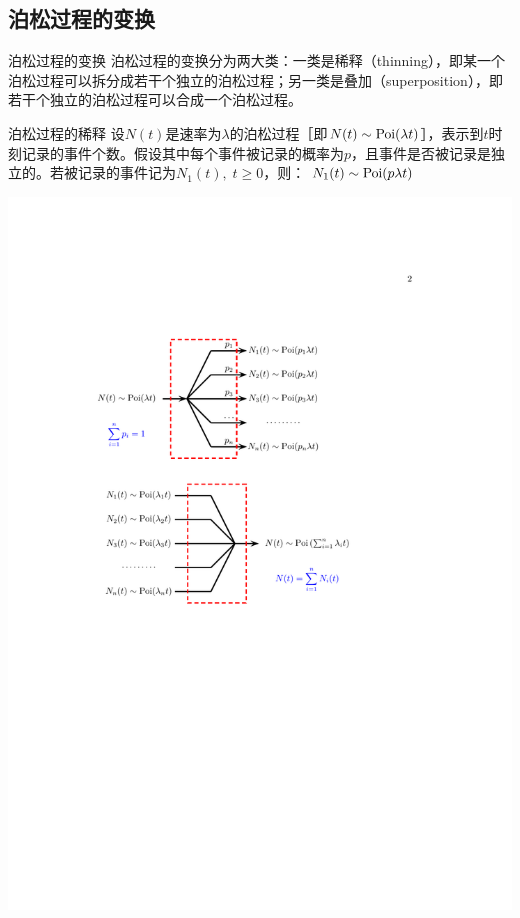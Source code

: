 \documentclass[t]{beamer}
\begin{document}
\subsection{泊松过程的变换}


\begin{frame}{泊松过程的变换}
    泊松过程的变换分为两大类：一类是稀释（thinning），即某一个泊松过程可以拆分成若干个独立的泊松过程；另一类是叠加（superposition），即若干个独立的泊松过程可以合成一个泊松过程。
\end{frame}


\begin{frame}{泊松过程的稀释}
设$N(t)$是速率为$\lambda$的泊松过程［即$N(t)\sim {\rm Poi}(\lambda t)$］，表示到$t$时刻记录的事件个数。假设其中每个事件被记录的概率为$p$，且事件是否被记录是独立的。若被记录的事件记为$N_1(t),\; t\ge 0$，则：
$N_1(t)\sim {\rm Poi}(p\lambda  t)$

\begin{center}
    \includegraphics[scale=0.85]{fig/poisson2.pdf}
\end{center}
\end{frame}
\end{document}
